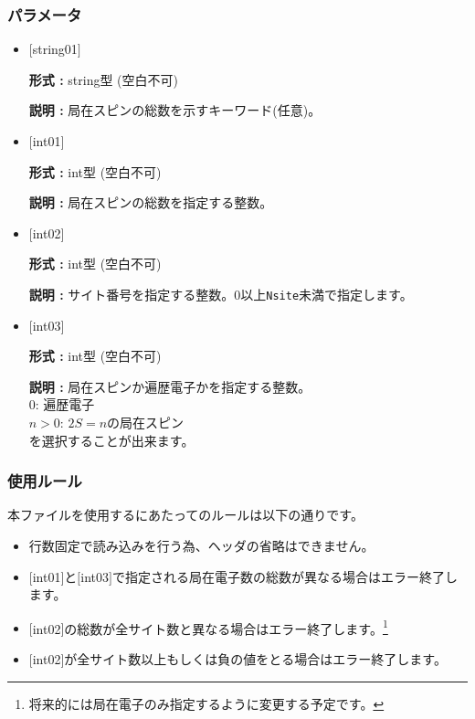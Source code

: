  \subsubsection{パラメータ}
 \begin{itemize}

 \item  $[$string01$]$

 {\bf 形式 :} string型 (空白不可)

{\bf 説明 :} 局在スピンの総数を示すキーワード(任意)。


  \item  $[$int01$]$

 {\bf 形式 :} int型 (空白不可)

{\bf 説明 :} 局在スピンの総数を指定する整数。

 
  \item  $[$int02$]$

 {\bf 形式 :} int型 (空白不可)

{\bf 説明 :} サイト番号を指定する整数。0以上\verb|Nsite|{未満}で指定します。

 
  \item  $[$int03$]$

 {\bf 形式 :} int型 (空白不可)

{\bf 説明 :} 局在スピンか遍歴電子かを指定する整数。\\
{
0: 遍歴電子\\
$n>0$: $2S=n$の局在スピン\\
}
を選択することが出来ます。
 \end{itemize}

\subsubsection{使用ルール}
本ファイルを使用するにあたってのルールは以下の通りです。
\begin{itemize}
\item 行数固定で読み込みを行う為、ヘッダの省略はできません。
\item $[$int01$]$と$[$int03$]$で指定される局在電子数の総数が異なる場合はエラー終了します。
\item $[$int02$]$の総数が全サイト数と異なる場合はエラー終了します。\footnote{将来的には局在電子のみ指定するように変更する予定です。}
\item $[$int02$]$が全サイト数以上もしくは負の値をとる場合はエラー終了します。
\end{itemize}


\newpage
